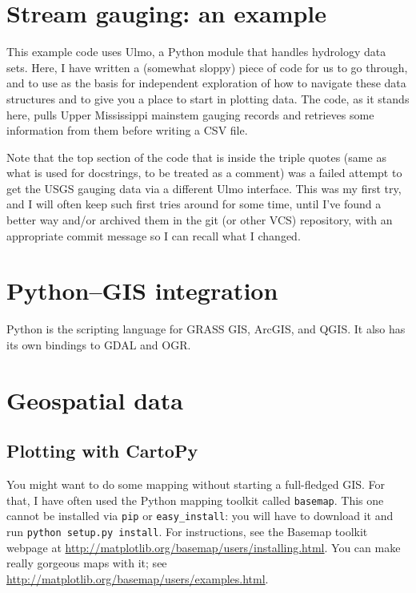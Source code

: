 \documentclass[a4paper,10pt]{scrartcl}
\begin{document}
\section{Stream gauging: an example}

This example code uses Ulmo, a Python module that handles hydrology data sets. Here, I have written a (somewhat sloppy) piece of code for us to go through, and to use as the basis for independent exploration of how to navigate these data structures and to give you a place to start in plotting data. The code, as it stands here, pulls Upper Mississippi mainstem gauging records and retrieves some information from them before writing a CSV file.

Note that the top section of the code that is inside the triple quotes (same as what is used for docstrings, to be treated as a comment) was a failed attempt to get the USGS gauging data via a different Ulmo interface. This was my first try, and I will often keep such first tries around for some time, until I've found a better way and/or archived them in the git (or other VCS) repository, with an appropriate commit message so I can recall what I changed.



\section{Python--GIS integration}

Python is the scripting language for GRASS GIS, ArcGIS, and QGIS. It also has its own bindings to GDAL and OGR.

\section{Geospatial data}

\subsection{Plotting with CartoPy}

You might want to do some mapping without starting a full-fledged GIS. For that, I have often used the Python mapping toolkit called \lstinline{basemap}. This one cannot be installed via \lstinline{pip} or \lstinline{easy_install}: you will have to download it and run \lstinline{python setup.py install}. For instructions, see the Basemap toolkit webpage at \url{http://matplotlib.org/basemap/users/installing.html}. You can make really gorgeous maps with it; see \url{http://matplotlib.org/basemap/users/examples.html}.
\end{document}
